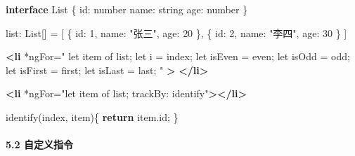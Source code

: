 \documentclass[
]{article}
\newenvironment{Shaded}{}{}
\newcommand{\AttributeTok}[1]{\textcolor[rgb]{0.49,0.56,0.16}{#1}}
\newcommand{\ControlFlowTok}[1]{\textcolor[rgb]{0.00,0.44,0.13}{\textbf{#1}}}
\newcommand{\DataTypeTok}[1]{\textcolor[rgb]{0.56,0.13,0.00}{#1}}
\newcommand{\DecValTok}[1]{\textcolor[rgb]{0.25,0.63,0.44}{#1}}
\newcommand{\FunctionTok}[1]{\textcolor[rgb]{0.02,0.16,0.49}{#1}}
\newcommand{\KeywordTok}[1]{\textcolor[rgb]{0.00,0.44,0.13}{\textbf{#1}}}
\newcommand{\NormalTok}[1]{#1}
\newcommand{\OperatorTok}[1]{\textcolor[rgb]{0.40,0.40,0.40}{#1}}
\newcommand{\OtherTok}[1]{\textcolor[rgb]{0.00,0.44,0.13}{#1}}
\newcommand{\StringTok}[1]{\textcolor[rgb]{0.25,0.44,0.63}{#1}}
\begin{document}
\begin{Shaded}
\begin{Highlighting}[]
\KeywordTok{interface}\NormalTok{ List \{}
  \DataTypeTok{id}\OperatorTok{:}\NormalTok{ number}
  \DataTypeTok{name}\OperatorTok{:}\NormalTok{ string}
  \DataTypeTok{age}\OperatorTok{:}\NormalTok{ number}
\NormalTok{\}}

\NormalTok{list}\OperatorTok{:}\NormalTok{ List[] }\OperatorTok{=}\NormalTok{ [}
\NormalTok{  \{ }\DataTypeTok{id}\OperatorTok{:} \DecValTok{1}\OperatorTok{,} \DataTypeTok{name}\OperatorTok{:} \StringTok{"张三"}\OperatorTok{,} \DataTypeTok{age}\OperatorTok{:} \DecValTok{20}\NormalTok{ \}}\OperatorTok{,}
\NormalTok{  \{ }\DataTypeTok{id}\OperatorTok{:} \DecValTok{2}\OperatorTok{,} \DataTypeTok{name}\OperatorTok{:} \StringTok{"李四"}\OperatorTok{,} \DataTypeTok{age}\OperatorTok{:} \DecValTok{30}\NormalTok{ \}}
\NormalTok{]}
\end{Highlighting}
\end{Shaded}

\begin{Shaded}
\begin{Highlighting}[]
\KeywordTok{\textless{}li}
\OtherTok{    *ngFor=}\StringTok{"}
\StringTok{      let item of list;}
\StringTok{      let i = index;}
\StringTok{      let isEven = even;}
\StringTok{      let isOdd = odd;}
\StringTok{      let isFirst = first;}
\StringTok{      let isLast = last;}
\StringTok{    "}
  \KeywordTok{\textgreater{}}
  \KeywordTok{\textless{}/li\textgreater{}}
\end{Highlighting}
\end{Shaded}

\begin{Shaded}
\begin{Highlighting}[]
\KeywordTok{\textless{}li}\OtherTok{ *ngFor=}\StringTok{"let item of list; trackBy: identify"}\KeywordTok{\textgreater{}\textless{}/li\textgreater{}}
\end{Highlighting}
\end{Shaded}

\begin{Shaded}
\begin{Highlighting}[]
\FunctionTok{identify}\NormalTok{(index}\OperatorTok{,}\NormalTok{ item)\{}
  \ControlFlowTok{return}\NormalTok{ item}\OperatorTok{.}\AttributeTok{id}\OperatorTok{;} 
\NormalTok{\}}
\end{Highlighting}
\end{Shaded}

\hypertarget{52-ux81eaux5b9aux4e49ux6307ux4ee4}{%
\paragraph{5.2 自定义指令}\label{52-ux81eaux5b9aux4e49ux6307ux4ee4}}
\end{document}
